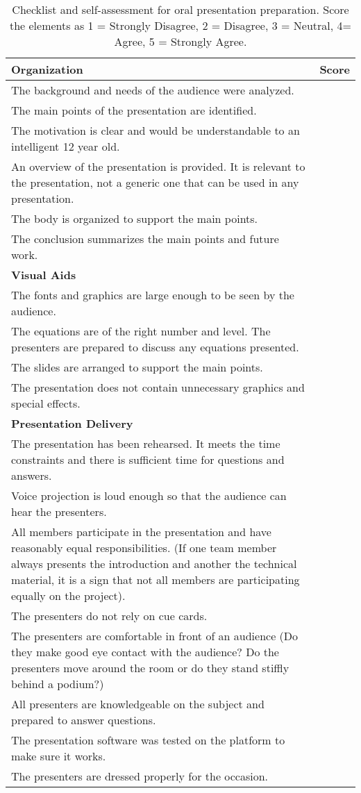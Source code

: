 \begin{table}
\caption{Checklist and self-assessment for oral presentation
preparation. Score the elements as 1 = Strongly Disagree, 2 = Disagree,
3 = Neutral, 4= Agree, 5 = Strongly Agree.}
\label{table:oralChecklist}
\begin{tabular}{|m{10cm}|m{1.5cm}|}
\hline

\textbf{Organization} &  \textbf{Score} \\ \hline

The background and needs of the audience were analyzed. & \\ \hline
The main points of the presentation are identified. & \\ \hline
The motivation is clear and would be understandable to an intelligent 12
year old. & \\ \hline
An overview of the presentation is provided. It is relevant to the
presentation, not a generic one that can be used in any presentation.
& \\ \hline
The body is organized to support the main points. & \\ \hline
The conclusion summarizes the main points and future work. & \\ \hline
\textbf{Visual Aids} & \\ \hline
The fonts and graphics are large enough to be seen by the audience. & \\ \hline
The equations are of the right number and level. The presenters are
prepared to discuss any equations presented. & \\ \hline
The slides are arranged to support the main points. & \\ \hline
The presentation does not contain unnecessary graphics and special
effects. & \\ \hline
\textbf{Presentation Delivery} & \\ \hline
The presentation has been rehearsed. It meets the time constraints and
there is sufficient time for questions and answers. & \\ \hline
Voice projection is loud enough so that the audience can hear the
presenters. & \\ \hline
All members participate in the presentation and have reasonably equal
responsibilities. (If one team member always presents the introduction
and another the technical material, it is a sign that not all members
are participating equally on the project). & \\ \hline
The presenters do not rely on cue cards. & \\ \hline
The presenters are comfortable in front of an audience (Do they make
good eye contact with the audience? Do the presenters move around the
room or do they stand stiffly behind a podium?) & \\ \hline
All presenters are knowledgeable on the subject and prepared to answer
questions. & \\ \hline
The presentation software was tested on the platform to make sure it
works. & \\ \hline
The presenters are dressed properly for the occasion. & \\ \hline


\end{tabular}
\end{table}
